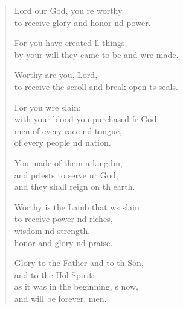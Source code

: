 \begin{verse}
  \begin{patverse}
 Lord our God, you re worthy\Med\\
to receive glory and honor nd power.

For you have created ll things;\Med\\
by your will they came to be and wre made.

Worthy are you,  Lord,\Med\\
to receive the scroll and break open \pointup{\i}ts seals.

For you wre slain;\Med\\
with your blood you purchased fr God\\
men of every race nd tongue,\Med\\
of every people nd nation.

You made of them a kingdm,\Flex\\
and priests to serve ur God,\Med\\
and they shall reign on th earth.

Worthy is the Lamb that ws slain\Med\\
to receive power nd riches,\Med\\
wisdom nd strength,\\
honor and glory nd praise.

Glory to the Father and to th Son,\Med\\
and to the Hol Spirit:\\
as it was in the beginning, \pointup{\i}s now,\Med\\
and will be forever. men.
  \end{patverse}
\end{verse}
